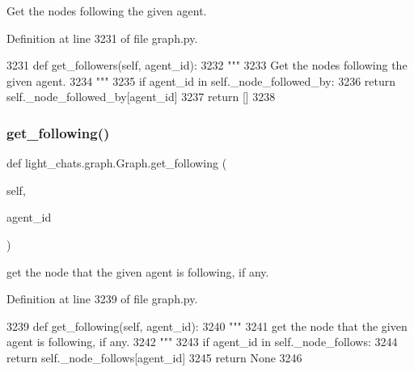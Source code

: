 \begin{DoxyVerb}Get the nodes following the given agent.
\end{DoxyVerb}
 

Definition at line 3231 of file graph.\+py.


\begin{DoxyCode}
3231     \textcolor{keyword}{def }get\_followers(self, agent\_id):
3232         \textcolor{stringliteral}{"""}
3233 \textcolor{stringliteral}{        Get the nodes following the given agent.}
3234 \textcolor{stringliteral}{        """}
3235         \textcolor{keywordflow}{if} agent\_id \textcolor{keywordflow}{in} self.\_node\_followed\_by:
3236             \textcolor{keywordflow}{return} self.\_node\_followed\_by[agent\_id]
3237         \textcolor{keywordflow}{return} []
3238 
\end{DoxyCode}
\mbox{\label{classlight__chats_1_1graph_1_1Graph_a1f4c0ccc957a89dcec003a73553914b7}} 
\subsubsection{\texorpdfstring{get\+\_\+following()}{get\_following()}}
{\footnotesize\ttfamily def light\+\_\+chats.\+graph.\+Graph.\+get\+\_\+following (\begin{DoxyParamCaption}\item[{}]{self,  }\item[{}]{agent\+\_\+id }\end{DoxyParamCaption})}

\begin{DoxyVerb}get the node that the given agent is following, if any.
\end{DoxyVerb}
 

Definition at line 3239 of file graph.\+py.


\begin{DoxyCode}
3239     \textcolor{keyword}{def }get\_following(self, agent\_id):
3240         \textcolor{stringliteral}{"""}
3241 \textcolor{stringliteral}{        get the node that the given agent is following, if any.}
3242 \textcolor{stringliteral}{        """}
3243         \textcolor{keywordflow}{if} agent\_id \textcolor{keywordflow}{in} self.\_node\_follows:
3244             \textcolor{keywordflow}{return} self.\_node\_follows[agent\_id]
3245         \textcolor{keywordflow}{return} \textcolor{keywordtype}{None}
3246 
\end{DoxyCode}
\mbox{\label{classlight__chats_1_1graph_1_1Graph_a8f2b0882918768e199aee89cf08bde41}} 
